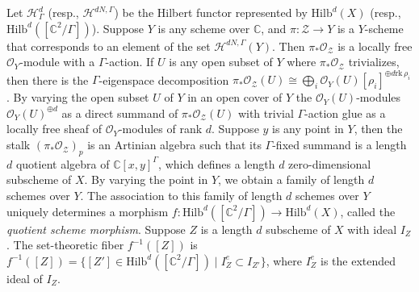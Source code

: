 \documentclass{amsart}[12pt]
\theoremstyle{definition}
\theoremstyle{remark}
\numberwithin{equation}{section}
\begin{document}
Let $\mathcal{H}^d_{\Gamma}$ (resp., $\mathcal{H}^{dN, \Gamma}$) be the Hilbert functor represented by $\mathrm{Hilb}^d(X)$ (resp., $\mathrm{Hilb}^{d}([\mathbb{C}^2/\Gamma])$). Suppose $Y$ is any scheme over $\mathbb{C}$, and $\pi: \mathcal{Z} \to Y$ is a $Y$-scheme that corresponds to an element of the set $\mathcal{H}^{dN, \Gamma}(Y)$. Then $\pi_* \mathcal{O}_{\mathcal{Z}}$ is a locally free $\mathcal{O}_Y$-module with a $\Gamma$-action. If $U$ is any open subset of $Y$ where $\pi_* \mathcal{O}_{\mathcal{Z}}$ trivializes, then there is the $\Gamma$-eigenspace decomposition $\pi_* \mathcal{O}_{\mathcal{Z}}(U) \cong \bigoplus_i \mathcal{O}_Y(U)[\rho_i]^{\oplus d \mathrm{rk}\, \rho_i}$. By varying the open subset $U$ of $Y$ in an open cover of $Y$ the $\mathcal{O}_Y(U)$-modules $\mathcal{O}_Y(U)^{\oplus d}$ as a direct summand of $\pi_* \mathcal{O}_{\mathcal{Z}}(U)$ with trivial $\Gamma$-action glue as a locally free sheaf of $\mathcal{O}_Y$-modules of rank $d$. Suppose $y$ is any point in $Y$, then the stalk $(\pi_* \mathcal{O}_{\mathcal{Z}})_p$ is an Artinian algebra such that its $\Gamma$-fixed summand is a length $d$ quotient algebra of $\mathbb{C}[x, y]^{\Gamma}$, which defines a length $d$ zero-dimensional subscheme of $X$. By varying the point in $Y$, we obtain a family of length $d$ schemes over $Y$. The association to this family of length $d$ schemes over $Y$ uniquely determines a morphism $f: \mathrm{Hilb}^{d}([\mathbb{C}^2/\Gamma]) \to \mathrm{Hilb}^d(X)$, called the \textit{quotient scheme morphism}. Suppose $Z$ is a length $d$ subscheme of $X$ with ideal $I_Z$. The set-theoretic fiber $f^{-1}([Z])$ is $f^{-1}([Z]) = \{[Z'] \in \mathrm{Hilb}^{d}([\mathbb{C}^2/\Gamma]) \mid I_Z^e \subset I_{Z'}\}$, where $I_Z^e$ is the extended ideal of $I_Z$. 
\end{document}
